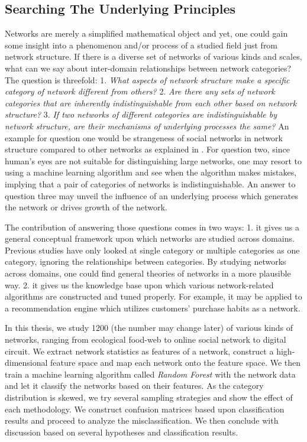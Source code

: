 \documentclass{article}
\begin{document}
	\subsection{Searching The Underlying Principles}
Networks are merely a simplified mathematical object and yet, one could gain some insight into a phenomenon and/or process of a studied field just from network structure. 
If there is a diverse set of networks of various kinds and scales, what can we say about inter-domain relationships between network categories? The question is threefold: 1. \textit{What aspects of network structure make a specific category of network different from others?} 2. \textit{Are there any sets of network categories that are inherently indistinguishable from each other based on network structure?} 3. \textit{If two networks of different categories are indistinguishable by network structure, are their mechanisms of underlying processes the same?} An example for question one would be strangeness of social networks in network structure compared to other networks as explained in \cite{WhySocialNetworks}.  For question two, since human's eyes are not suitable for distinguishing large networks, one may resort to using a machine learning algorithm and see when the algorithm makes mistakes, implying that a pair of categories of networks is indistinguishable.  An answer to question three may unveil the influence of an underlying process which generates the network or drives growth of the network.

The contribution of answering those questions comes in two ways: 1. it gives us a general conceptual framework upon which networks are studied across domains. Previous studies have only looked at single category or multiple categories as one category, ignoring the relationships between categories. By studying networks across domains, one could find general theories of networks in a more plausible way. 2. it gives us the knowledge base upon which various network-related algorithms are constructed and tuned properly.  For example, it may be applied to a recommendation engine which utilizes customers' purchase habits as a network.

In this thesis, we study 1200 (the number may change later) of various kinds of networks, ranging from ecological food-web to online social network to digital circuit. We extract network statistics as features of a network, construct a high-dimensional feature space and map each network onto the feature space. We then train a machine learning algorithm called \textit{Random Forest} with the network data and let it classify the networks based on their features. As the category distribution is skewed, we try several sampling strategies and show the effect of each methodology. We construct confusion matrices based upon classification results and proceed to analyze the misclassification. We then conclude with discussion based on several hypotheses and classification results.
\end{document}
